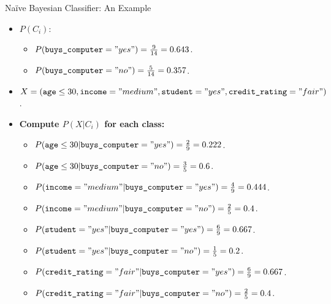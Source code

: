 \begin{frame}{Naïve Bayesian Classifier: An Example}
  \begin{itemize}
  \item $P(C_i)$:
    \begin{itemize}
    \item $P(\texttt{buys\_computer} = "yes") = \frac{9}{14} = 0.643$.
    \item $P(\texttt{buys\_computer} = "no") = \frac{5}{14} = 0.357$.
    \end{itemize}
  \item $X = (\texttt{age} \leq 30 , \texttt{income} = "medium", \texttt{student} = "yes", \texttt{credit\_rating} = "fair")$.
  \item \textbf{Compute $P(X|C_i)$ for each class:}
    \begin{itemize}
    \item $P(\texttt{age} \leq 30 | \texttt{buys\_computer} = "yes") = \frac{2}{9} = 0.222$.
    \item $P(\texttt{age} \leq 30 | \texttt{buys\_computer} = "no") = \frac{3}{5} = 0.6$.
    \item $P(\texttt{income} = "medium" | \texttt{buys\_computer} = "yes") = \frac{4}{9} = 0.444$.
    \item $P(\texttt{income} = "medium" | \texttt{buys\_computer} = "no") = \frac{2}{5} = 0.4$.
    \item $P(\texttt{student} = "yes" | \texttt{buys\_computer} = "yes") = \frac{6}{9} = 0.667$.
    \item $P(\texttt{student} = "yes" | \texttt{buys\_computer} = "no") = \frac{1}{5} = 0.2$.
    \item $P(\texttt{credit\_rating} = "fair" | \texttt{buys\_computer} = "yes") = \frac{6}{9} = 0.667$.
    \item $P(\texttt{credit\_rating} = "fair" | \texttt{buys\_computer} = "no") = \frac{2}{5} = 0.4$.
    \end{itemize}
  \end{itemize}
\end{frame}

